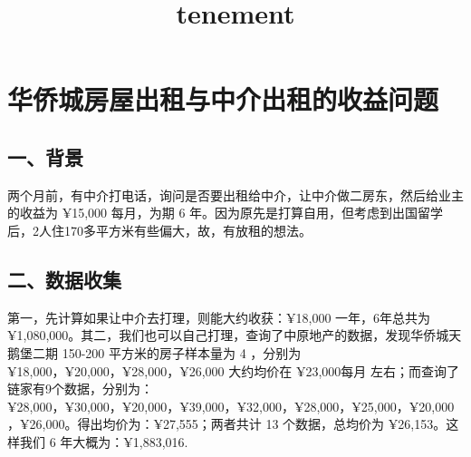 \documentclass[11pt]{article}
\title{tenement }
\begin{document}
    
    
    \maketitle
    
    

    
    \hypertarget{ux534eux4fa8ux57ceux623fux5c4bux51faux79dfux4e0eux4e2dux4ecbux51faux79dfux7684ux6536ux76caux95eeux9898}{%
\section{华侨城房屋出租与中介出租的收益问题}\label{ux534eux4fa8ux57ceux623fux5c4bux51faux79dfux4e0eux4e2dux4ecbux51faux79dfux7684ux6536ux76caux95eeux9898}}

\hypertarget{ux4e00ux80ccux666f}{%
\subsection{一、背景}\label{ux4e00ux80ccux666f}}

两个月前，有中介打电话，询问是否要出租给中介，让中介做二房东，然后给业主的收益为
¥15,000 每月，为期 6
年。因为原先是打算自用，但考虑到出国留学后，2人住170多平方米有些偏大，故，有放租的想法。

\hypertarget{ux4e8cux6570ux636eux6536ux96c6}{%
\subsection{二、数据收集}\label{ux4e8cux6570ux636eux6536ux96c6}}

第一，先计算如果让中介去打理，则能大约收获：¥18,000 一年，6年总共为
¥1,080,000。其二，我们也可以自己打理，查询了中原地产的数据，发现华侨城天鹅堡二期
150-200 平方米的房子样本量为 4 ，分别为
¥18,000，¥20,000，¥28,000，¥26,000 大约均价在 ¥23,000每月
左右；而查询了链家有9个数据，分别为：¥28,000，¥30,000，¥20,000，¥39,000，¥32,000，¥28,000，¥25,000，¥20,000，¥26,000。得出均价为：¥27,555；两者共计
13 个数据，总均价为 ¥26,153。这样我们 6 年大概为：¥1,883,016.
\end{document}
